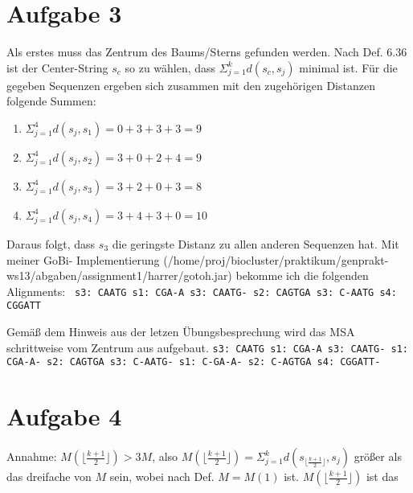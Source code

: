 \documentclass[a4paper,10pt,oneside,reqno]{scrartcl}
\begin{document}
\section*{Aufgabe 3}%
Als erstes muss das Zentrum des Baums/Sterns gefunden werden. Nach Def. 6.36 ist der Center-String $s_c$ 
so zu wählen, dass $\Sigma_{j=1}^k d(s_c, s_j)$ minimal ist. Für die gegeben Sequenzen ergeben sich
zusammen mit den zugehörigen Distanzen folgende Summen:
\begin{enumerate}
 \item $\Sigma_{j=1}^4 d(s_j, s_1) = 0 + 3 + 3 + 3 = 9$
 \item $\Sigma_{j=1}^4 d(s_j, s_2) = 3 + 0 + 2 + 4 = 9$
 \item $\Sigma_{j=1}^4 d(s_j, s_3) = 3 + 2 + 0 + 3 = 8$
 \item $\Sigma_{j=1}^4 d(s_j, s_4) = 3 + 4 + 3 + 0 = 10$
\end{enumerate}
Daraus folgt, dass $s_3$ die geringste Distanz zu allen anderen Sequenzen hat. Mit meiner GoBi-
Implementierung (/home/proj/biocluster/praktikum/genprakt-ws13/abgaben/assignment1/harrer/gotoh.jar) bekomme ich die folgenden Alignments:\newline
\texttt{
s3: CAATG\newline
s1: CGA-A\newline\newline
s3: CAATG-\newline
s2: CAGTGA\newline\newline
s3: C-AATG\newline
s4: CGGATT\newline}

Gemäß dem Hinweis aus der letzen Übungsbesprechung wird das MSA schrittweise vom Zentrum aus aufgebaut.
\texttt{s3: CAATG\newline
s1: CGA-A\newline\newline
s3: CAATG-\newline
s1: CGA-A-\newline
s2: CAGTGA
\newline\newline
s3: C-AATG-\newline
s1: C-GA-A-\newline
s2: C-AGTGA\newline
s4: CGGATT-}

\section*{Aufgabe 4}%
Annahme: $M(\lfloor \frac{k+1}{2}\rfloor) > 3M$, also 
$M(\lfloor \frac{k+1}{2}\rfloor) = \Sigma_{j=1}^k d(s_{\lfloor \frac{k+1}{2}\rfloor}, s_j)$ größer als
das dreifache von $M$ sein, wobei nach Def. $M = M(1)$ ist. $M(\lfloor \frac{k+1}{2}\rfloor)$ ist das
\end{document}
